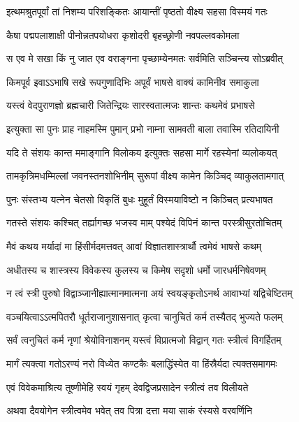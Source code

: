 \begin{center}
\twolineshloka
{इत्थमश्रुतपूर्वां तां निशम्य परिशङ्कितः}
{आयान्तीं पृष्ठतो वीक्ष्य सहसा विस्मयं गतः} %

\twolineshloka
{कैषा पद्मपलाशाक्षी पीनोन्नतपयोधरा}
{कृशोदरी बृहच्छ्रोणी नवपल्लवकोमला} %

\twolineshloka
{स एव मे सखा किं नु जात एव वराङ्गना}
{पृच्छाम्येनमतः सर्वमिति सञ्चिन्त्य सोऽब्रवीत्} %

\twolineshloka
{किमपूर्व इवाऽऽभाषि सखे रूपगुणादिभिः}
{अपूर्वं भाषसे वाक्यं कामिनीव समाकुला} %

\twolineshloka
{यस्त्वं वेदपुराणज्ञो ब्रह्मचारी जितेन्द्रियः}
{सारस्वतात्मजः शान्तः कथमेवं प्रभाषसे} %

\twolineshloka
{इत्युक्ता सा पुनः प्राह नाहमस्मि पुमान् प्रभो}
{नाम्ना सामवती बाला तवास्मि रतिदायिनी} %

\twolineshloka
{यदि ते संशयः कान्त ममाङ्गानि विलोकय}
{इत्युक्तः सहसा मार्गे रहस्येनां व्यलोकयत्} %

\twolineshloka
{तामकृत्रिमधम्मिल्लां जवनस्तनशोभिनीम्}
{सुरूपां वीक्ष्य कामेन किञ्चिद् व्याकुलतामगात्} %

\twolineshloka
{पुनः संस्तभ्य यत्नेन चेतसो विकृतिं बुधः}
{मुहूर्तं विस्मयाविष्टो न किञ्चित् प्रत्यभाषत} %

\twolineshloka
{गतस्ते संशयः कश्चित् तर्ह्यागच्छ भजस्व माम्}
{पश्येदं विपिनं कान्त परस्त्रीसुरतोचितम्} %

\twolineshloka
{मैवं कथय मर्यादां मा हिंसीर्मदमत्तवत्}
{आवां विज्ञातशास्त्रार्थौ त्वमेवं भाषसे कथम्} %

\twolineshloka
{अधीतस्य च शास्त्रस्य विवेकस्य कुलस्य च}
{किमेष सदृशो धर्मो जारधर्मनिषेवणम्} %

\twolineshloka
{न त्वं स्त्री पुरुषो विद्वाञ्जानीह्यात्मानमात्मना}
{अयं स्वयङ्कृतोऽनर्थ आवाभ्यां यद्विचेष्टितम्} %

\twolineshloka
{वञ्चयित्वाऽऽत्मपितरौ धूर्तराजानुशासनात्}
{कृत्वा चानुचितं कर्म तस्यैतद् भुज्यते फलम्} %

\twolineshloka
{सर्वं त्वनुचितं कर्म नृणां श्रेयोविनाशनम्}
{यस्त्वं विप्रात्मजो विद्वान् गतः स्त्रीत्वं विगर्हितम्} %

\twolineshloka
{मार्गं त्यक्त्वा गतोऽरण्यं नरो विध्येत कण्टकैः}
{बलाद्धिंस्येत वा हिंस्रैर्यदा त्यक्तसमागमः} %

\twolineshloka
{एवं विवेकमाश्रित्य तूष्णीमेहि स्वयं गृहम्}
{देवद्विजप्रसादेन स्त्रीत्वं तव विलीयते} %

\twolineshloka
{अथवा दैवयोगेन स्त्रीत्वमेव भवेत् तव}
{पित्रा दत्ता मया साकं रंस्यसे वरवर्णिनि} %


\end{center}
